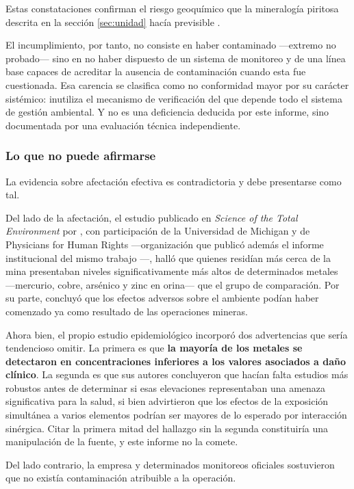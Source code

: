 Estas constataciones confirman el riesgo geoquímico que la mineralogía piritosa
descrita en la sección \ref{sec:unidad} hacía previsible
\parencite{sec2011ni43101}.

El incumplimiento, por tanto, no consiste en haber contaminado —extremo no
probado— sino en no haber dispuesto de un sistema de monitoreo y de una línea base
capaces de acreditar la ausencia de contaminación cuando esta fue cuestionada.
Esa carencia se clasifica como no conformidad mayor por su carácter sistémico:
inutiliza el mecanismo de verificación del que depende todo el sistema de gestión
ambiental. Y no es una deficiencia deducida por este informe, sino documentada
por una evaluación técnica independiente.

\subsubsection{Lo que no puede afirmarse}

La evidencia sobre afectación efectiva es contradictoria y debe presentarse como
tal.

Del lado de la afectación, el estudio publicado en \textit{Science of the Total
Environment} por \textcite{basu2010scitotenv}, con participación de la
Universidad de Michigan y de Physicians for Human Rights —organización que
publicó además el informe institucional del mismo trabajo
\parencite{basu2010metales}—, halló que quienes
residían más cerca de la mina presentaban niveles significativamente más altos
de determinados metales —mercurio, cobre, arsénico y zinc en orina— que el grupo
de comparación. Por su parte, \textcite{etech2010water} concluyó que los
efectos adversos sobre el ambiente podían haber comenzado ya como resultado de
las operaciones mineras.

Ahora bien, el propio estudio epidemiológico incorporó dos advertencias que sería
tendencioso omitir. La primera es que \textbf{la mayoría de los metales se
detectaron en concentraciones inferiores a los valores asociados a daño
clínico}. La segunda es que sus autores concluyeron que hacían falta estudios
más robustos antes de determinar si esas elevaciones representaban una amenaza
significativa para la salud, si bien advirtieron que los efectos de la
exposición simultánea a varios elementos podrían ser mayores de lo esperado por
interacción sinérgica. Citar la primera mitad del hallazgo sin la segunda
constituiría una manipulación de la fuente, y este informe no la comete.

Del lado contrario, la empresa y determinados monitoreos oficiales sostuvieron que
no existía contaminación atribuible a la operación.

